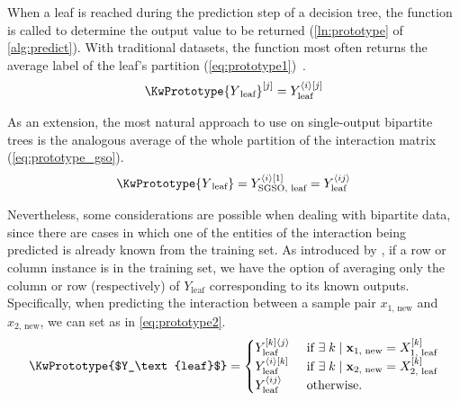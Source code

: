 When a leaf is reached during the prediction step of a decision tree, the \KwPrototype function is called to determine the output value to be returned (\autoref{ln:prototype} of \autoref{alg:predict}).
With traditional datasets, the \KwPrototype function
most often returns the average label of the leaf's partition (\autoref{eq:prototype1})~\cite{breiman1984classification}.
%
\begin{equation}
    \KwPrototype{Y\textsubscript{leaf}}\el j=Y_\text{leaf}^{\ang{i}[j]}
    \label{eq:prototype1}
\end{equation}

As an extension, the most natural approach to use on single-output bipartite trees is the analogous average of the whole partition of the interaction matrix (\autoref{eq:prototype_gso}).
%
\begin{equation}
    \KwPrototype{Y\textsubscript{leaf}}
        = Y_\text{SGSO, leaf}^{\ang{i}[1]}
        = Y_\text{leaf}^{\ang{ij}}
    \label{eq:prototype_gso}
\end{equation}

Nevertheless, some considerations are possible when dealing with bipartite data, since there are cases in which one of the entities of the interaction being predicted is already known from the training set. As introduced by , if a row or column instance is in the training set, we have the option of averaging only the column or row (respectively) of $Y_\text{leaf}$ corresponding to its known outputs. Specifically, when predicting the interaction between a sample pair $x_{1\text{, new}}$ and $x_{2\text{, new}}$, we can set \KwPrototype as in \autoref{eq:prototype2}.
\begin{equation}
    \KwPrototype{$Y_\text{leaf}$} =
    \begin{cases}
        Y_\text{leaf}^{[k]\ang{j}} & \text{ if }
            \exists \; k \mid \x_{1\text{, new}} = X_{1\text{, leaf}}\el{k}\\
        Y_\text{leaf}^{\ang{i}[k]} & \text{ if }
            \exists \; k \mid \x_{2\text{, new}} = X_{2\text{, leaf}}\el{k}\\
        Y_\text{leaf}\mel{ij} & \text{ otherwise.}
    \end{cases}
    \label{eq:prototype2}
\end{equation}

